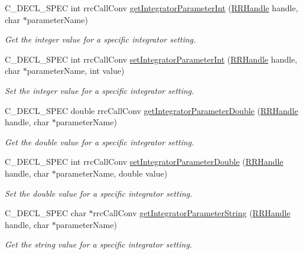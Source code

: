 \begin{DoxyCompactItemize}
C\+\_\+\+D\+E\+C\+L\+\_\+\+S\+P\+E\+C int rrc\+Call\+Conv \hyperlink{group__simopts_ga45805f74ab551df53520a8ea03c499cd}{get\+Integrator\+Parameter\+Int} (\hyperlink{rrc__types_8h_a1d68f0592372208fa5a5f2799ea4b3ae}{R\+R\+Handle} handle, char $\ast$parameter\+Name)
\begin{DoxyCompactList}\small\item\em Get the integer value for a specific integrator setting. \end{DoxyCompactList}\item 
C\+\_\+\+D\+E\+C\+L\+\_\+\+S\+P\+E\+C int rrc\+Call\+Conv \hyperlink{group__simopts_gaf5ce794bca9b6b8a60bb15e9b64bdaf1}{set\+Integrator\+Parameter\+Int} (\hyperlink{rrc__types_8h_a1d68f0592372208fa5a5f2799ea4b3ae}{R\+R\+Handle} handle, char $\ast$parameter\+Name, int value)
\begin{DoxyCompactList}\small\item\em Set the integer value for a specific integrator setting. \end{DoxyCompactList}\item 
C\+\_\+\+D\+E\+C\+L\+\_\+\+S\+P\+E\+C double rrc\+Call\+Conv \hyperlink{group__simopts_ga5d1a97952f28e70d92d5b6ba71eafd29}{get\+Integrator\+Parameter\+Double} (\hyperlink{rrc__types_8h_a1d68f0592372208fa5a5f2799ea4b3ae}{R\+R\+Handle} handle, char $\ast$parameter\+Name)
\begin{DoxyCompactList}\small\item\em Get the double value for a specific integrator setting. \end{DoxyCompactList}\item 
C\+\_\+\+D\+E\+C\+L\+\_\+\+S\+P\+E\+C int rrc\+Call\+Conv \hyperlink{group__simopts_ga48a56b47335553c84f2f5132adaeb9d3}{set\+Integrator\+Parameter\+Double} (\hyperlink{rrc__types_8h_a1d68f0592372208fa5a5f2799ea4b3ae}{R\+R\+Handle} handle, char $\ast$parameter\+Name, double value)
\begin{DoxyCompactList}\small\item\em Set the double value for a specific integrator setting. \end{DoxyCompactList}\item 
C\+\_\+\+D\+E\+C\+L\+\_\+\+S\+P\+E\+C char $\ast$rrc\+Call\+Conv \hyperlink{group__simopts_ga2f175aab11a88d4c1939aaecb11f7848}{get\+Integrator\+Parameter\+String} (\hyperlink{rrc__types_8h_a1d68f0592372208fa5a5f2799ea4b3ae}{R\+R\+Handle} handle, char $\ast$parameter\+Name)
\begin{DoxyCompactList}\small\item\em Get the string value for a specific integrator setting. \end{DoxyCompactList}\item 

\end{DoxyCompactItemize}
